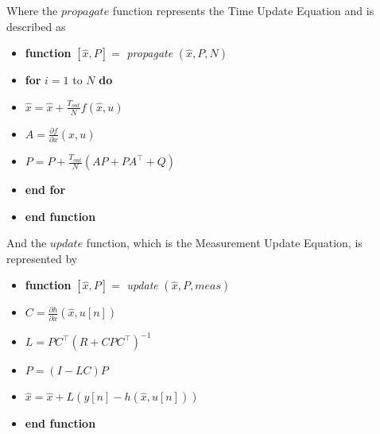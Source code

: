 Where the $propagate$ function represents the Time Update Equation and is described as
\begin{itemize}
\item \textbf{function} $[\hat{x},P]=$ \textit{propagate} $(\hat{x},P,N)$
\item \quad \textbf{for} $i=1$ to $N$ \textbf{do}
\item \qquad $\hat{x}=\hat{x}+\frac{T_{out}}{N}f(\hat{x},u)$
\item \qquad $A=\frac{\partial f}{\partial x}(\hat{x},u)$
\item \qquad $P=P+\frac{T_{out}}{N}(AP+PA^\top+Q)$
\item \quad \textbf{end for}
\item \textbf{end function}
\end{itemize}
And the $update$ function, which is the Measurement Update Equation, is represented by
\begin{itemize}
\item \textbf{function} $[\hat{x},P]=$ \textit{update} $(\hat{x},P,meas)$
\item \quad $C = \frac{\partial h}{\partial x}(\hat{x},u[n])$
\item \quad $L = PC^\top(R+CPC^\top)^{-1}$
\item \quad $P = (I-LC)P$
\item \quad $\hat{x} = \hat{x}+L(y[n]-h(\hat{x},u[n]))$
\item \textbf{end function}
\end{itemize}

